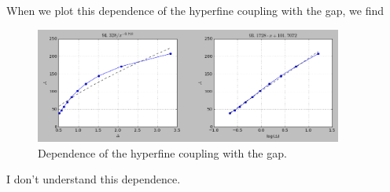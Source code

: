 
When we plot this dependence of the hyperfine coupling with the gap, we find
\begin{figure}[h!]
\centering
\includegraphics[width=0.9\textwidth]{chapter05/figures/A_gap.png}
\vspace{-5pt}
\caption{Dependence of the hyperfine coupling with the gap.}
\end{figure}
\FloatBarrier
I don't understand this dependence.







